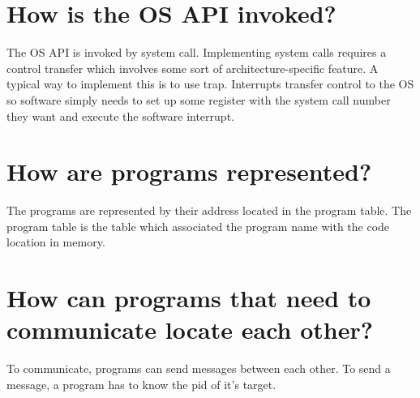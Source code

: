 \section{How is the OS API invoked?}
The OS API is invoked by system call.
Implementing system calls requires a control transfer which involves some sort of architecture-specific feature.
A typical way to implement this is to use trap. Interrupts transfer control to the OS so 
software simply needs to set up some register with the system call number they want and execute the software interrupt.

\section{How are programs represented?}
The programs are represented by their address located in the program table.
The program table is the table which associated the program name with the code location in memory.

\section{How can programs that need to communicate locate each other?}
To communicate, programs can send messages between each other. To send a message, a program has to know
the pid of it's target.

